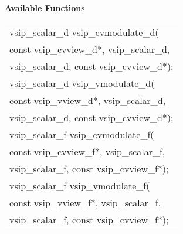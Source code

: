 \cvsiplh
\newline \hspace*{.8cm} \vspace*{.1cm} \textbf{Available Functions }
\newline \hspace*{1.1cm} {
\ttfamily
\begin{tabular}[H]{l}
vsip\_scalar\_d vsip\_cvmodulate\_d(\\*\hspace{.6cm}const vsip\_cvview\_d*, vsip\_scalar\_d, \\*\hspace{.6cm}vsip\_scalar\_d, const vsip\_cvview\_d*);\\
vsip\_scalar\_d vsip\_vmodulate\_d(\\*\hspace{.6cm}const vsip\_vview\_d*, vsip\_scalar\_d, \\*\hspace{.6cm}vsip\_scalar\_d, const vsip\_cvview\_d*);\\
vsip\_scalar\_f vsip\_cvmodulate\_f(\\*\hspace{.6cm}const vsip\_cvview\_f*, vsip\_scalar\_f, \\*\hspace{.6cm}vsip\_scalar\_f, const vsip\_cvview\_f*);\\
vsip\_scalar\_f vsip\_vmodulate\_f(\\*\hspace{.6cm}const vsip\_vview\_f*, vsip\_scalar\_f, \\*\hspace{.6cm}vsip\_scalar\_f, const vsip\_cvview\_f*);\\
\end{tabular}
}
\pyjvsiph
{}
